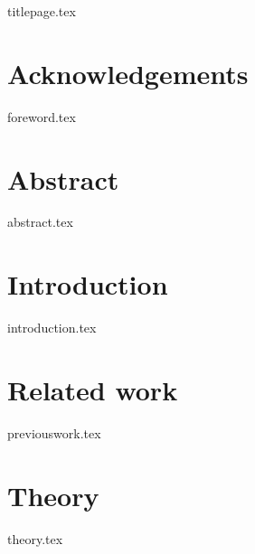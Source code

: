 \documentclass[12pt, a4paper]{report}
\begin{document}
{titlepage.tex}

\chapter*{Acknowledgements}
{foreword.tex}
\afterpage{\blankpage}

\chapter*{Abstract}
{abstract.tex}
\afterpage{\blankpage}

\tableofcontents
\newpage
\afterpage{\blankpage}

\chapter{Introduction} \label{chapter:introduction}
{introduction.tex}

\chapter{Related work} \label{chapter:related}
{previouswork.tex}

\chapter{Theory} \label{chapter:theory}
{theory.tex}

\end{document}
